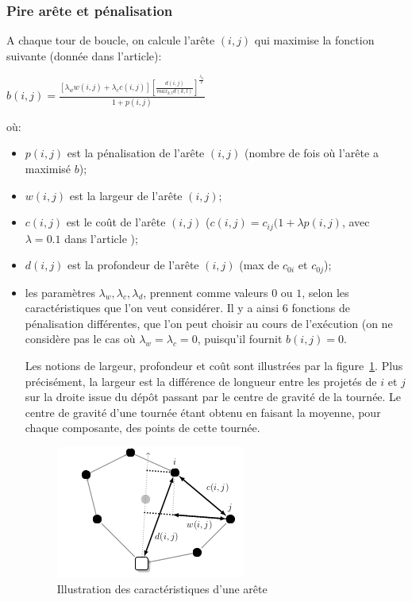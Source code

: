\documentclass[a4paper,11pt]{article}%
\begin{document}
\subsubsection{Pire arête et pénalisation}
A chaque tour de boucle, on calcule l'arête $(i,j)$ qui maximise la fonction suivante (donnée dans l'article):
\begin{center}
$b(i,j) = \frac{[\lambda_w w(i,j) + \lambda_c c(i,j)] [\frac{d(i,j)}{max_{k,l}d(k,l)}] ^ {\frac{\lambda_d}{2}}}{1+p(i,j)}$
\end{center}
où:
\begin{itemize}
\item $p(i,j)$ est la pénalisation de l'arête $(i,j)$ (nombre de fois où l'arête a maximisé $b$);
\item $w(i,j)$ est la largeur de l'arête $(i,j)$;
\item $c(i,j)$ est le coût de l'arête $(i,j)$ ($c(i,j) = c_{ij}(1 + \lambda p(i,j)$, avec $\lambda = 0.1$ dans l'article \cite{Sorensen_2017});
\item $d(i,j)$ est la profondeur de l'arête $(i,j)$ (max de $c_{0i}$ et $c_{0j}$);
\item les paramètres $\lambda_w,\lambda_c,\lambda_d$, prennent comme valeurs $0$ ou $1$, selon les caractéristiques que l'on veut considérer. 
Il y a ainsi 6 fonctions de pénalisation différentes, que l'on peut choisir au cours de l'exécution (on ne considère pas le cas où $\lambda_w = \lambda_c = 0$, puisqu'il fournit $b(i,j) = 0$.

Les notions de largeur, profondeur et coût sont illustrées par la figure~\ref{metrics}. 
Plus précisément, la largeur est la différence de longueur entre les projetés de $i$ et $j$ sur la droite issue du dépôt passant par le centre de gravité de la tournée. 
Le centre de gravité d'une tournée étant obtenu en faisant la moyenne, pour chaque composante, des points de cette tournée.

\begin{figure}
\centering
\includegraphics[scale=0.6]{metrics.png}
\caption{Illustration des caractéristiques d'une arête}
\label{metrics}
\end{figure}

\end{itemize}
\end{document}
